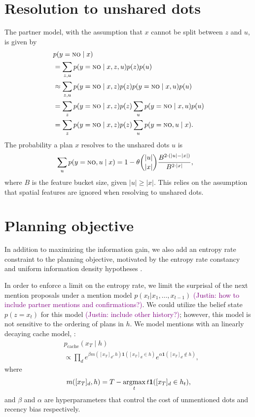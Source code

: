 \documentclass[11pt]{article}
\newcommand{\justin}[1]{{{\textcolor{purple}{(Justin: #1)}}}}
\begin{document}
\section{Resolution to unshared dots}
\label{sec:unshared-marginal}
The partner model, with the assumption that
$x$ cannot be split between $z$ and $u$,
is given by
\begin{align*}
&p(y=\textsc{no} \mid x)\\
&= \sum_{z,u}p(y = \textsc{no} \mid x,z,u)p(z)p(u)\\
&\approx \sum_{z,u}p(y=\textsc{no} \mid x,z)p(z) p(y=\textsc{no} \mid  x,u)p(u)\\
&= \sum_z p(y=\textsc{no} \mid x,z)p(z) \sum_u p(y=\textsc{no} \mid  x,u)p(u)\\
&= \sum_z p(y=\textsc{no} \mid x,z)p(z) \sum_u p(y=\textsc{no},u \mid  x).
\end{align*}
The probability a plan $x$ resolves to the unshared dots $u$ is
\begin{align*}
\sum_u p(y=\textsc{no},u \mid x)
&= 1-\theta {|u|\choose|x|}\frac{B^{2 \cdot (|u|-|x|)}}{B^{2\cdot|x|}},
\end{align*}
where $B$ is the feature bucket size,
given $|u| \ge |x|$.
This relies on the assumption that spatial features are ignored when resolving to unshared dots.

\section{Planning objective}
In addition to maximizing the information gain,
we also add an entropy rate constraint to the planning objective,
motivated by the entropy rate constancy and uniform information density hypotheses \citep{erc,uid,ercdial}.

In order to enforce a limit on the entropy rate, 
we limit the surprisal of the next mention proposals
under a mention model $p(x_t | x_1,\ldots,x_{t-1})$ \justin{how to include partner mentions and confirmations?}.
We could utilize the belief state $p(z = x_t)$ for this model \justin{include other history?}; however, this model is not sensitive to the ordering of plans in $h$.
We model mentions with an linearly decaying cache model,
\citep{cache}:
\begin{align*}
&p_{\text{cache}}(x_T \mid h)\\
&\propto \prod_d e^{\beta m([x_T]_d,h)
    \mathbf{1}([x_T]_d\in h)
}
e^{\alpha\mathbf{1}([x_T]_d \notin h)},
\end{align*}
where
$$m([x_T]_d,h) = T - \operatorname*{argmax}_t t\mathbf1([x_T]_d \in h_t),$$
and $\beta$ and $\alpha$ are hyperparameters that control
the cost of unmentioned dots and recency bias respectively.
\end{document}
